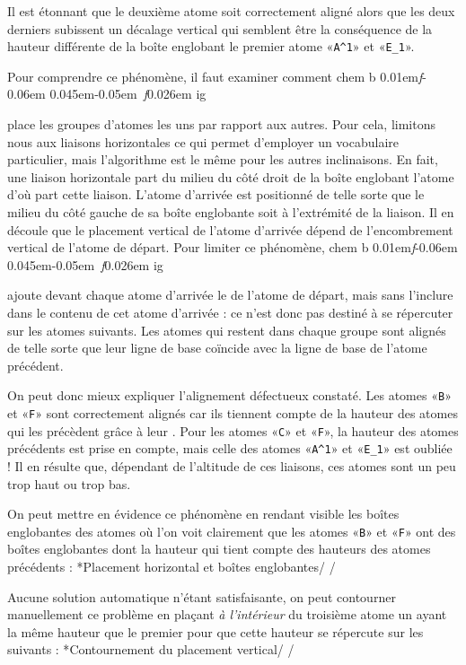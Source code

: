 \documentclass[10pt,french]{article}
\makeatletter
\newcommand\make@car@active[1]{%
	\catcode`#1\active
	\begingroup
		\lccode`\~`#1\relax
		\lowercase{\endgroup\def~}%
}
\newif\if@exstar
\newcommand\exemple{%
	\begingroup
	\parskip\z@
	\@makeother\;\@makeother\!\@makeother\?\@makeother\:%
	\@ifstar{\@exstartrue\exemple@}{\@exstarfalse\exemple@}}
\newcommand\exemple@[2][65]{%
	\medbreak\noindent
	\begingroup
		\let\do\@makeother\dospecials
		\make@car@active\ { {}}%
		\make@car@active\^^M{\par\leavevmode}%
		\make@car@active\^^I{\space\space}%
		\make@car@active\,{\leavevmode\kern\z@\string,}%
		\make@car@active\-{\leavevmode\kern\z@\string-}%
		\make@car@active\>{\leavevmode\kern\z@\string>}%
		\make@car@active\<{\leavevmode\kern\z@\string<}%
		\exemple@@{#1}{#2}%
}
\newcommand\exemple@@[3]{%
	\def\@tempa##1#3{\exemple@@@{#1}{#2}{##1}}%
	\@tempa
}
\newcommand\exemple@@@[3]{%
	\xdef\the@code{#3}%
	\endgroup
	\if@exstar
		\begingroup
			\fboxrule0.4pt
			\let\breakboxparindent\z@
			\def\bkvz@bottom{\hrule\@height\fboxrule}%
			\let\bkvz@before@breakbox\relax
			\def\bkvz@set@linewidth{\advance\linewidth\dimexpr-2\fboxrule-2\fboxsep}%
			\def\bkvz@left{\vrule\@width\fboxrule\hskip\fboxsep}%
			\def\bkvz@right{\hskip\fboxsep\vrule\@width\fboxrule}%
			\def\bkvz@top{\hbox to \hsize{%
				\vrule\@width\fboxrule\@height\fboxrule
				\leaders\bkvz@bottom\hfill
				\sffamily
				\fboxsep\z@
				\colorbox{black}{\kern0.25em\color{white}\footnotesize\lower0.5ex\hbox{\strut#2}\kern0.25em}%
				\leaders\bkvz@bottom\hfill
				\vrule\@width\fboxrule\@height\fboxrule}}%
			\breakbox
				\kern.5ex\relax
				\ttfamily\footnotesize\the@code\par
				\normalfont
				\kern3pt
				\hrule height0.1pt width\linewidth depth0.1pt
				\vskip5pt
				\rightskip0pt plus 1fill
				\everypar{{\color{lightgray}\rlap{\vrule height0.1pt width\linewidth depth0.1pt}}\hskip0pt plus 1fill}%
				\newlinechar`\^^M\everyeof{\noexpand}\scantokens{#3}\par
			\endbreakbox
		\endgroup
	\else
		\vskip0.5ex
		\boxput*(0,1)
			{\fboxsep\z@
			\hbox{\sffamily\colorbox{black}{\leavevmode\kern0.25em{\color{white}\footnotesize\strut#2}\kern0.25em}}%
			}%
			{\fboxsep5pt
			\fbox{%
				$\vcenter{\hsize\dimexpr0.#1\linewidth-\fboxsep-\fboxrule\relax
					\kern5pt\parskip0pt \ttfamily\footnotesize\the@code}%
				\vcenter{\kern5pt\hsize\dimexpr\linewidth-0.#1\linewidth-\fboxsep-\fboxrule\relax
					\everypar{{\color{lightgray}\rlap{\vrule height0.1pt width\dimexpr\linewidth-0.#1\linewidth-\fboxsep-\fboxrule depth0.1pt}}}%
					\footnotesize\newlinechar`\^^M\everyeof{\noexpand}\scantokens{#3}}$%
				}%
			}%
	\fi
	\medbreak
	\endgroup
}
\newcommand\falseverb[1]{{\ttfamily\detokenize\expandafter{\string#1}}}
\let\do\@makeother\dospecials
\DeclareRobustCommand\CF{%
	\textsf{%
		chem%
		\if\string b\detokenize\expandafter{\f@series}%
			\lower0.01em\hbox{\itshape f}\kern-0.06em
		\else
			\lower0.045em\hbox{\kern-0.05em \itshape f}\kern0.026em
		\fi ig%
		}%
		\xspace
}
\makeatother
\begin{document}
Il est étonnant que le deuxième atome soit correctement aligné alors que les deux derniers subissent un décalage vertical qui semblent être la conséquence de la hauteur différente de la boîte englobant le premier atome «\verb-A^1-» et «\verb-E_1-».

Pour comprendre ce phénomène, il faut examiner comment \CF place les groupes d'atomes les uns par rapport aux autres. Pour cela, limitons nous aux liaisons horizontales ce qui permet d'employer un vocabulaire particulier, mais l'algorithme est le même pour les autres inclinaisons. En fait, une liaison horizontale part du milieu du côté droit de la boîte englobant l'atome d'où part cette liaison. L'atome d'arrivée est positionné de telle sorte que le milieu du côté gauche de sa boîte englobante soit à l'extrémité de la liaison. Il en découle que le placement vertical de l'atome d'arrivée dépend de l'encombrement vertical de l'atome de départ. Pour limiter ce phénomène, \CF ajoute devant chaque atome d'arrivée le \falseverb{\vphantom} de l'atome de départ, mais sans l'inclure dans le contenu de cet atome d'arrivée : ce \falseverb{\vphantom} n'est donc pas destiné à se répercuter sur les atomes suivants. Les atomes qui restent dans chaque groupe sont alignés de telle sorte que leur ligne de base coïncide avec la ligne de base de l'atome précédent.

On peut donc mieux expliquer l'alignement défectueux constaté. Les atomes «\verb-B-» et «\verb-F-» sont correctement alignés car ils tiennent compte de la hauteur des atomes qui les précèdent grâce à leur \falseverb\vphantom. Pour les atomes «\verb-C-» et «\verb-F-», la hauteur des atomes précédents est prise en compte, mais celle des atomes «\verb-A^1-» et «\verb-E_1-» est oubliée ! Il en résulte que, dépendant de l'altitude de ces liaisons, ces atomes sont un peu trop haut ou trop bas.

On peut mettre en évidence ce phénomène en rendant visible les boîtes englobantes des atomes où l'on voit clairement que les atomes «\verb-B-» et «\verb-F-» ont des boîtes englobantes dont la hauteur qui tient compte des hauteurs des atomes précédents :
\exemple*{Placement horizontal et boîtes englobantes}/\Huge{}
\fboxsep=0pt
\renewcommand\printatom[1]{\fbox{\ensuremath{\mathrm#1}}}
\qquad
{}/

Aucune solution automatique n'étant satisfaisante, on peut contourner manuellement ce problème en plaçant \emph{à l'intérieur} du troisième atome un \falseverb{\vphantom} ayant la même hauteur que le premier pour que cette hauteur se répercute sur les suivants :
\exemple*{Contournement du placement vertical}/\Huge{}
\qquad
{}/
\end{document}
